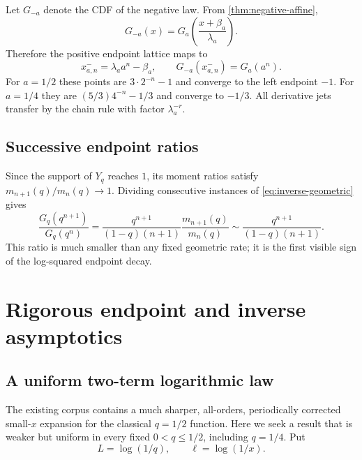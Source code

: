\documentclass[11pt,oneside]{article}
\numberwithin{equation}{section}
\theoremstyle{definition}
\theoremstyle{remark}
\begin{document}
Let $G_{-a}$ denote the CDF of the negative law.  From
\cref{thm:negative-affine},
\begin{equation}
 G_{-a}(x)=G_a\!\left(\frac{x+\beta_a}{\lambda_a}\right).
 \label{eq:negative-CDF-affine}
\end{equation}
Therefore the positive endpoint lattice maps to
\begin{equation}
 x_{a,n}^{-}=\lambda_aa^n-\beta_a,
 \qquad
 \boxed{G_{-a}(x_{a,n}^{-})=G_a(a^n).}
 \label{eq:negative-endpoint-lattice}
\end{equation}
For $a=1/2$ these points are $3\cdot2^{-n}-1$ and converge to the left endpoint
$-1$.  For $a=1/4$ they are $(5/3)4^{-n}-1/3$ and converge to $-1/3$.
All derivative jets transfer by the chain rule with factor $\lambda_a^{-r}$.

\subsection{Successive endpoint ratios}

Since the support of $Y_q$ reaches $1$, its moment ratios satisfy
$m_{n+1}(q)/m_n(q)\to1$.  Dividing consecutive instances of
\eqref{eq:inverse-geometric} gives
\begin{equation}
 \frac{G_q(q^{n+1})}{G_q(q^n)}
 =\frac{q^{n+1}}{(1-q)(n+1)}
  \frac{m_{n+1}(q)}{m_n(q)}
 \sim\frac{q^{n+1}}{(1-q)(n+1)}.
 \label{eq:endpoint-ratio}
\end{equation}
This ratio is much smaller than any fixed geometric rate; it is the first
visible sign of the log-squared endpoint decay.

\section{Rigorous endpoint and inverse asymptotics}
\label{sec:endpoint-asymptotic}

\subsection{A uniform two-term logarithmic law}

The existing corpus contains a much sharper, all-orders, periodically corrected
small-$x$ expansion for the classical $q=1/2$ function.  Here we seek a result
that is weaker but uniform in every fixed $0<q\le1/2$, including $q=1/4$.
Put
\begin{equation}
 L=\log(1/q),
 \qquad
 \ell=\log(1/x).
 \label{eq:L-ell}
\end{equation}
\end{document}
